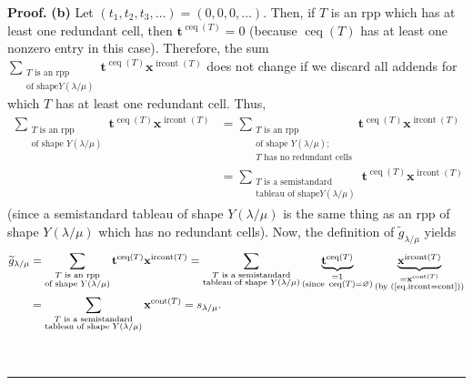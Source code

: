 \documentclass[numbers=enddot,12pt,final,onecolumn,notitlepage]{scrartcl}%
\theoremstyle{definition}
\newenvironment{proof}[1][Proof]{\noindent\textbf{#1.} }{\ \rule{0.5em}{0.5em}}
\newenvironment{vershort}{}{}
\let\sumnonlimits\sum
\renewcommand{\sum}{\sumnonlimits\limits}
\begin{document}
\begin{proof}
\begin{vershort}
\textbf{(b)} Let $\left(  t_{1},t_{2},t_{3},\ldots\right)  =\left(
0,0,0,\ldots\right)  $. Then, if $T$ is an rpp which has at least one redundant
cell, then $\mathbf{t}^{\operatorname*{ceq}\left(  T\right)  }=0$ (because
$\operatorname*{ceq}\left(  T\right)  $ has at least one nonzero entry in this
case). Therefore, the sum $\sum_{\substack{T\text{ is an rpp}\\\text{of shape
}Y\left(  \lambda/\mu\right)  }}\mathbf{t}^{\operatorname*{ceq}\left(
T\right)  }\mathbf{x}^{\operatorname*{ircont}\left(  T\right)  }$ does not
change if we discard all addends for which $T$ has at least one redundant cell.
Thus,%
\begin{align*}
\sum_{\substack{T\text{ is an rpp}\\\text{of shape }Y\left(  \lambda
/\mu\right)  }}\mathbf{t}^{\operatorname*{ceq}\left(  T\right)  }%
\mathbf{x}^{\operatorname*{ircont}\left(  T\right)  }  &  =\sum
_{\substack{T\text{ is an rpp}\\\text{of shape }Y\left(  \lambda/\mu\right)
;\\T\text{ has no redundant cells}}}\mathbf{t}^{\operatorname*{ceq}\left(
T\right)  }\mathbf{x}^{\operatorname*{ircont}\left(  T\right)  }\\
&  =\sum_{\substack{T\text{ is a semistandard}\\\text{tableau of shape
}Y\left(  \lambda/\mu\right)  }}\mathbf{t}^{\operatorname*{ceq}\left(
T\right)  }\mathbf{x}^{\operatorname*{ircont}\left(  T\right)  }%
\end{align*}
(since a semistandard tableau of shape $Y\left(  \lambda/\mu\right)  $ is the
same thing as an rpp of shape $Y\left(  \lambda/\mu\right)  $ which has no
redundant cells). Now, the definition of $\widetilde{g}_{\lambda/\mu}$ yields%
\begin{align*}
\widetilde{g}_{\lambda/\mu}  &  =\sum_{\substack{T\text{ is an rpp}\\\text{of
shape }Y\left(  \lambda/\mu\right)  }}\mathbf{t}^{\operatorname*{ceq}\left(
T\right)  }\mathbf{x}^{\operatorname*{ircont}\left(  T\right)  }%
=\sum_{\substack{T\text{ is a semistandard}\\\text{tableau of shape }Y\left(
\lambda/\mu\right)  }}\underbrace{\mathbf{t}^{\operatorname*{ceq}\left(
T\right)  }}_{\substack{=1\\\text{(since }\operatorname*{ceq}\left(  T\right)
=\varnothing\text{)}}}\underbrace{\mathbf{x}^{\operatorname*{ircont}\left(
T\right)  }}_{\substack{=\mathbf{x}^{\operatorname*{cont}\left(  T\right)
}\\\text{(by (\ref{eq.ircont=cont}))}}}\\
&  =\sum_{\substack{T\text{ is a semistandard}\\\text{tableau of shape
}Y\left(  \lambda/\mu\right)  }}\mathbf{x}^{\operatorname*{cont}\left(
T\right)  }=s_{\lambda/\mu}.
\end{align*}


\end{vershort}
\end{proof}
\end{document}
